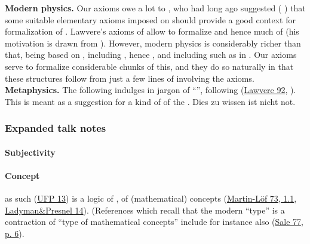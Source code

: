 \documentclass[12pt,titlepage]{article}
\theoremstyle{plain}
\theoremstyle{definition}
\theoremstyle{remark}
\begin{document}
\textbf{Modern physics.} Our axioms owe a lot to , who had long ago suggested (  ) that some suitable elementary axioms imposed on  should provide a good context for formalization of . Lawvere's axioms of  allow to formalize  and hence much of  (his motivation is drawn from ). However, modern physics is considerably richer than that, being based on    , including , hence , and including  such as  in . Our axioms serve to formalize considerable chunks of this, and they do so naturally in that these structures follow from just a few lines of  involving the axioms.
\textbf{Metaphysics.} The following indulges in  jargon of ``'', following (\href{http://ncatlab.org/nlab/show/objective+and+subjective+logic#Lawvere92}{Lawvere 92}, ). This is meant as a suggestion for a kind of  of the . Dies zu wissen ist nicht not.
\hypertarget{expanded_talk_notes}{}\subsubsection*{{Expanded talk notes}}\label{expanded_talk_notes}
\hypertarget{FormalizationConcepts}{}\paragraph*{{Subjectivity}}\label{FormalizationConcepts}
\hypertarget{ConceptFormalization}{}\paragraph*{{Concept}}\label{ConceptFormalization}
 as such (\hyperlink{UFP13}{UFP 13}) is a logic of , of (mathematical) concepts (\hyperlink{MartinLoef73}{Martin-Löf 73, 1.1}, \hyperlink{LadymanPresnel14}{Ladyman\&Presnel 14}). (References which recall that the modern ``type'' is a contraction of ``type of mathematical concepts'' include for instance also (\hyperlink{Sale77}{Sale 77, p. 6}).
\end{document}
